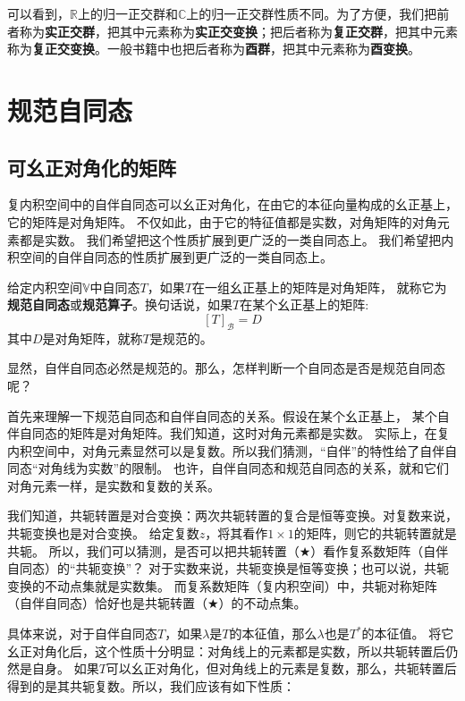 \documentclass[12pt,UTF8]{ctexbook}
\begin{document}
可以看到，$\mathbb{R}$上的归一正交群和$\mathbb{C}$上的归一正交群性质不同。为了方便，我们把前者称为\textbf{实正交群}，把其中元素称为\textbf{实正交变换}；把后者称为\textbf{复正交群}，把其中元素称为\textbf{复正交变换}。一般书籍中也把后者称为\textbf{酉群}，把其中元素称为\textbf{酉变换}。

\section{规范自同态}
\subsection{可幺正对角化的矩阵}
复内积空间中的自伴自同态可以幺正对角化，在由它的本征向量构成的幺正基上，它的矩阵是对角矩阵。
不仅如此，由于它的特征值都是实数，对角矩阵的对角元素都是实数。
我们希望把这个性质扩展到更广泛的一类自同态上。
我们希望把内积空间的自伴自同态的性质扩展到更广泛的一类自同态上。
\begin{df}\label{df:8_3}
    给定内积空间$\mathbb{V}$中自同态$T$，如果$T$在一组幺正基上的矩阵是对角矩阵，
    就称它为\textbf{规范自同态}或\textbf{规范算子}。换句话说，如果$T$在某个幺正基上的矩阵:
    $$ [T]_{\mathcal{B}} = D $$
    其中$D$是对角矩阵，就称$T$是规范的。
\end{df}
显然，自伴自同态必然是规范的。那么，怎样判断一个自同态是否是规范自同态呢？

首先来理解一下规范自同态和自伴自同态的关系。假设在某个幺正基上，
某个自伴自同态的矩阵是对角矩阵。我们知道，这时对角元素都是实数。
实际上，在复内积空间中，对角元素显然可以是复数。所以我们猜测，“自伴”的特性给了自伴自同态“对角线为实数”的限制。
也许，自伴自同态和规范自同态的关系，就和它们对角元素一样，是实数和复数的关系。

我们知道，共轭转置是对合变换：两次共轭转置的复合是恒等变换。对复数来说，共轭变换也是对合变换。
给定复数$z$，将其看作$1\times 1$的矩阵，则它的共轭转置就是共轭。
所以，我们可以猜测，是否可以把共轭转置（$\bigstar$）看作复系数矩阵（自伴自同态）的“共轭变换”？
对于实数来说，共轭变换是恒等变换；也可以说，共轭变换的不动点集就是实数集。
而复系数矩阵（复内积空间）中，共轭对称矩阵（自伴自同态）恰好也是共轭转置（$\bigstar$）的不动点集。

具体来说，对于自伴自同态$T$，如果$\lambda$是$T$的本征值，那么$\lambda$也是$T^*$的本征值。
将它幺正对角化后，这个性质十分明显：对角线上的元素都是实数，所以共轭转置后仍然是自身。
如果$T$可以幺正对角化，但对角线上的元素是复数，那么，共轭转置后得到的是其共轭复数。所以，我们应该有如下性质：
\end{document}
